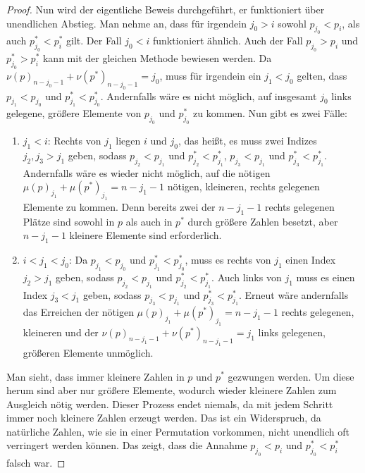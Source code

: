 \documentclass[a4paper, 10pt, ngerman]{article}
\begin{document}
\begin{proof}
    Nun wird der eigentliche Beweis durchgeführt, er funktioniert über unendlichen Abstieg. Man nehme an, dass für irgendein $j_0 > i$ sowohl $p_{j_0} < p_i$, als auch $p^*_{j_0} < p^*_i$ gilt. Der Fall $j_0 < i$ funktioniert ähnlich. Auch der Fall $p_{j_0} > p_i$ und $p^*_{j_0} > p^*_i$ kann mit der gleichen Methode bewiesen werden. Da $\nu(p)_{n - j_0 - 1} + \nu(p^*)_{n - j_0 - 1} = j_0$, muss für irgendein ein $j_1 < j_0$ gelten, dass $p_{j_1} < p_{j_0}$ und $p^*_{j_1} < p^*_{j_0}$. Andernfalls wäre es nicht möglich, auf insgesamt $j_0$ links gelegene, größere Elemente von $p_{j_0}$ und $p^*_{j_0}$ zu kommen. Nun gibt es zwei Fälle:
    \begin{enumerate}
        \item $j_1 < i$: Rechts von $j_1$ liegen $i$ und $j_0$, das heißt, es muss zwei Indizes $j_2, j_3 > j_1$ geben, sodass $p_{j_2} < p_{j_1}$ und $p^*_{j_2} < p^*_{j_1}$, $p_{j_3} < p_{j_1}$ und $p^*_{j_3} < p^*_{j_1}$. Andernfalls wäre es wieder nicht möglich, auf die nötigen $\mu(p)_{j_1} + \mu(p^*)_{j_1} = n - j_1 - 1$ nötigen, kleineren, rechts gelegenen Elemente zu kommen. Denn bereits zwei der $n - j_1 - 1$ rechts gelegenen Plätze sind sowohl in $p$ als auch in $p^*$ durch größere Zahlen besetzt, aber $n - j_1 - 1$ kleinere Elemente sind erforderlich.
        \item $i < j_1 < j_0$: Da $p_{j_1} < p_{j_0}$ und $p^*_{j_1} < p^*_{j_0}$, muss es rechts von $j_1$ einen Index $j_2 > j_1$ geben, sodass $p_{j_2} < p_{j_1}$ und $p^*_{j_2} < p^*_{j_1}$. Auch links von $j_1$ muss es einen Index $j_3 < j_1$ geben, sodass $p_{j_3} < p_{j_1}$ und $p^*_{j_3} < p^*_{j_1}$. Erneut wäre andernfalls das Erreichen der nötigen $\mu(p)_{j_1} + \mu(p^*)_{j_1} = n - j_1 - 1$ rechts gelegenen, kleineren und der $\nu(p)_{n - j_1 - 1} + \nu(p^*)_{n - j_1 - 1} = j_1$ links gelegenen, größeren Elemente unmöglich.
    \end{enumerate}
    Man sieht, dass immer kleinere Zahlen in $p$ und $p^*$ gezwungen werden. Um diese herum sind aber nur größere Elemente, wodurch wieder kleinere Zahlen zum Ausgleich nötig werden. Dieser Prozess endet niemals, da mit jedem Schritt immer noch kleinere Zahlen erzeugt werden. Das ist ein Widerspruch, da natürliche Zahlen, wie sie in einer Permutation vorkommen, nicht unendlich oft verringert werden können. Das zeigt, dass die Annahme $p_{j_0} < p_i$ und $p^*_{j_0} < p^*_i$ falsch war.
\end{proof}
\end{document}
